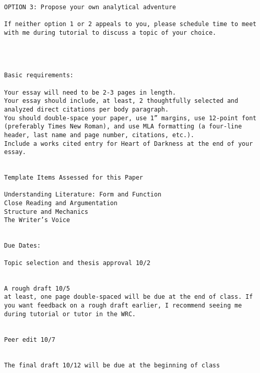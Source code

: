 \documentclass[letterpaper]{article}
\begin{document}
\begin{verbatim}
OPTION 3: Propose your own analytical adventure

If neither option 1 or 2 appeals to you, please schedule time to meet with me during tutorial to discuss a topic of your choice. 




Basic requirements:

Your essay will need to be 2-3 pages in length.
Your essay should include, at least, 2 thoughtfully selected and analyzed direct citations per body paragraph. 
You should double-space your paper, use 1” margins, use 12-point font (preferably Times New Roman), and use MLA formatting (a four-line header, last name and page number, citations, etc.).
Include a works cited entry for Heart of Darkness at the end of your essay.


Template Items Assessed for this Paper

Understanding Literature: Form and Function
Close Reading and Argumentation
Structure and Mechanics
The Writer’s Voice


Due Dates:

Topic selection and thesis approval 10/2 


A rough draft 10/5 
at least, one page double-spaced will be due at the end of class. If you want feedback on a rough draft earlier, I recommend seeing me during tutorial or tutor in the WRC.


Peer edit 10/7 


The final draft 10/12 will be due at the beginning of class
\end{verbatim}
\end{document}
